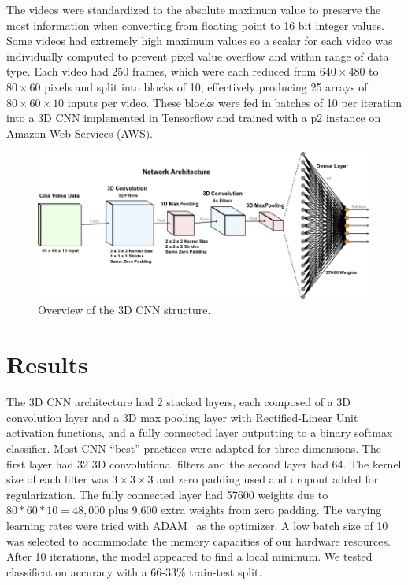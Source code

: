 The videos were standardized to the absolute maximum value to preserve the most information when converting from floating point to 16 bit integer values. Some videos had extremely high maximum values so a scalar for each video was individually computed to prevent pixel value overflow and within range of data type. Each video had 250 frames, which were each reduced from $640 \times 480$ to $80 \times 60$ pixels and split into blocks of 10, effectively producing 25 arrays of $80 \times 60 \times 10$ inputs per video. These blocks were fed in batches of 10 per iteration into a 3D CNN implemented in Tensorflow and trained with a p2 instance on Amazon Web Services (AWS). 

\begin{figure}
\includegraphics[scale=1.2]{arch}
\caption{Overview of the 3D CNN structure.}
\end{figure}

\section{Results}

The 3D CNN architecture had 2 stacked layers, each composed of a 3D convolution layer and a 3D max pooling layer with Rectified-Linear Unit \cite{nair2010rectified} activation functions, and a fully connected layer outputting to a binary softmax classifier. Most CNN ``best'' practices \cite{goodfellow_bengio_courville_2016} were adapted for three dimensions. The first layer had 32 3D convolutional filters and the second layer had 64. The kernel size of each filter was $3 \times 3 \times 3$ and zero padding used and dropout \cite{srivastava2014dropout} added for regularization. The fully connected layer had 57600 weights due to $80 * 60 * 10 = 48,000$ plus 9,600 extra weights from zero padding. The varying learning rates were tried with ADAM~\cite{kingma2014adam} as the optimizer. A low batch size of 10 was selected to accommodate the memory capacities of our hardware resources. After 10 iterations, the model appeared to find a local minimum. We tested classification accuracy with a 66-33\% train-test split. 

